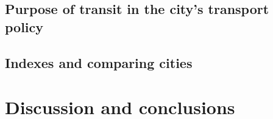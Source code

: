 \documentclass[preprint, 3p,
authoryear]{elsarticle} %
\begin{document}
\hypertarget{purpose-of-transit-in-the-citys-transport-policy}{%
\subsection{Purpose of transit in the city's transport
policy}\label{purpose-of-transit-in-the-citys-transport-policy}}

\hypertarget{indexes-and-comparing-cities}{%
\subsection{Indexes and comparing
cities}\label{indexes-and-comparing-cities}}

\hypertarget{discussion-and-conclusions}{%
\section{Discussion and conclusions}\label{discussion-and-conclusions}}

\renewcommand\refname{References}

\end{document}

